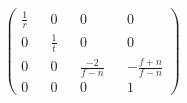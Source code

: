 \begin{figure} [h!]
  \[
  \begin{pmatrix}
    \frac{1}{r} &&           0 &&                 0 &&                0 \\
              0 && \frac{1}{t} &&                 0 &&                0 \\ 
              0 &&           0 &&    \frac{-2}{f-n} && -\frac{f+n}{f-n} \\ 
              0 &&           0 &&                 0 &&                1
  \end{pmatrix}
  \]
\end{figure}
